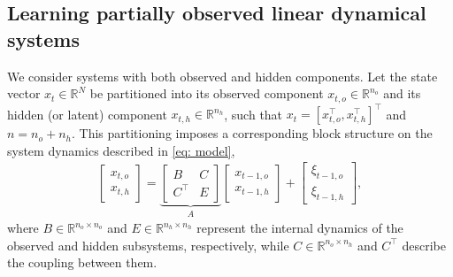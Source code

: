 \documentclass[11pt]{article}
\begin{document}
\subsection{Learning partially observed linear dynamical systems}
We consider systems with both observed and hidden components. Let the state vector $x_t \in \mathbb{R}^N$ be partitioned into its observed component $x_{t,o} \in \mathbb{R}^{n_o}$ and its hidden (or latent) component $x_{t,h} \in \mathbb{R}^{n_h}$, such that $x_t = [x_{t,o}^\top, x_{t,h}^\top]^\top$ and $n = n_o + n_h$. This partitioning imposes a corresponding block structure on the system dynamics described in \eqref{eq: model},
\begin{align}
    \label{eq: model (partial obs)}
    \begin{bmatrix}
        x_{t,o} \\ x_{t,h}
    \end{bmatrix}
    =
    \underbrace{\begin{bmatrix}
        B & C \\ C^\top & E
    \end{bmatrix}}_{A}
    \begin{bmatrix}
        x_{t-1,o} \\ x_{t-1,h}
    \end{bmatrix} + 
    \begin{bmatrix}
        \xi_{t-1,o} \\ \xi_{t-1,h}
    \end{bmatrix}, 
\end{align}
where $B \in \mathbb{R}^{n_o \times n_o}$ and $E \in \mathbb{R}^{n_h \times n_h}$ represent the internal dynamics of the observed and hidden subsystems, respectively, while $C \in \mathbb{R}^{n_o \times n_h}$ and $C^\top$ describe the coupling between them.
\end{document}
